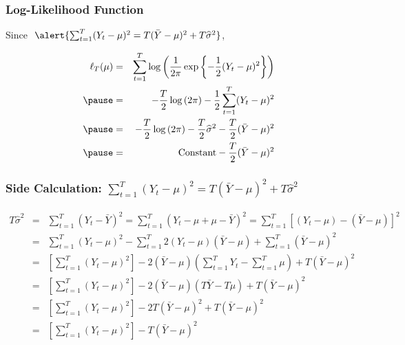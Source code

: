 \begin{frame}
  \frametitle{Log-Likelihood Function}

  Since $\; \alert{\sum_{t=1}^T (Y_t -\mu)^2 = T(\bar{Y} - \mu)^2 + T \widehat{\sigma}^2}$,

\begin{eqnarray*}
	\ell_T(\mu)&=& \sum_{t=1}^T \log \left( \frac{1}{2\pi} \exp \left\{-\frac{1}{2}(Y_t - \mu)^2 \right\}\right)\\ \pause
  &=& -\frac{T}{2} \log\left( 2\pi \right) - \frac{1}{2} \sum_{t=1}^{T} (Y_t - \mu)^2\\ \pause
  &=& -\frac{T}{2} \log\left( 2\pi \right) - \frac{T}{2} \widehat{\sigma}^2 - \frac{T}{2}(\bar{Y} - \mu)^2\\ \pause
  &=& \text{Constant} - \frac{T}{2}(\bar{Y} - \mu)^2
\end{eqnarray*}

\end{frame}
\begin{frame}
  \frametitle{Side Calculation: \normalsize $\sum_{t=1}^T (Y_t -\mu)^2 = T(\bar{Y} - \mu)^2 + T \widehat{\sigma}^2$}

\scriptsize
\begin{eqnarray*}
  T\widehat{\sigma}^2 &=& \sum_{t=1}^T \left(Y_t - \bar{Y}\right)^2 = \sum_{t=1}^T \left(Y_t - \mu + \mu - \bar{Y}\right)^2 = \sum_{t=1}^T \left[(Y_t -\mu) - (\bar{Y} - \mu)\right]^2\\
		&=&\sum_{t=1}^T (Y_t -\mu)^2 - \sum_{t=1}^T 2(Y_t -\mu)(\bar{Y} - \mu) + \sum_{t=1}^T (\bar{Y} - \mu)^2\\
				&=& \left[  \sum_{t=1}^T \left(Y_t - \mu\right)^2\right]   - 2(\bar{Y} - \mu) \left( \sum_{t=1}^T Y_t- \sum_{t=1}^T \mu \right)+T(\bar{Y} - \mu)^2\\
				&=& \left[  \sum_{t=1}^T \left(Y_t - \mu\right)^2\right]   - 2(\bar{Y} - \mu)(T\bar{Y}-T\mu)+T(\bar{Y} - \mu)^2\\
				&=&\left[  \sum_{t=1}^T \left(Y_t - \mu\right)^2\right]   - 2T(\bar{Y} - \mu)^2+T(\bar{Y} - \mu)^2\\
				&=&\left[  \sum_{t=1}^T \left(Y_t - \mu\right)^2\right]   - T(\bar{Y} - \mu)^2
\end{eqnarray*}
\end{frame}
